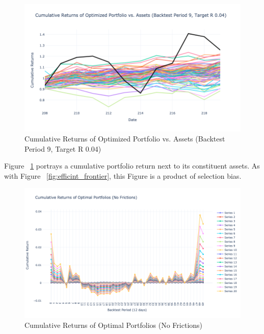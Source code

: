 \documentclass[12pt,twoside]{article}
\begin{document}
\begin{figure}[]
\centering %
\includegraphics[width = 1.0\hsize]{./figures/Cumulative_Rets.png} %
\caption{Cumulative Returns of Optimized Portfolio vs. Assets (Backtest Period 9, Target R 0.04)}
\label{fig:Cumulative_Rets}
\end{figure}

Figure ~\ref{fig:Cumulative_Rets} portrays a cumulative portfolio return next to its constituent assets. As with Figure ~\ref{fig:efficint_frontier}, this Figure is a product of selection bias.

\begin{figure}[]
\centering %
\includegraphics[width = 1.0\hsize]{./figures/Cumulative_returns.png} %
\caption{Cumulative Returns of Optimal Portfolios (No Frictions)}
\label{fig:cuml rets}
\end{figure}
\end{document}
